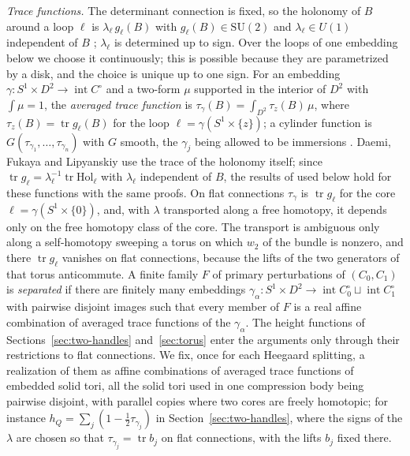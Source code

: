 \documentclass[11pt]{amsart}
\theoremstyle{definition}
\theoremstyle{remark}
\theoremstyle{plain}
\numberwithin{equation}{section}
\newcommand{\tr}{\operatorname{tr}}
\newcommand{\SU}{\mathrm{SU}}
\begin{document}
\emph{Trace functions.} The determinant connection is fixed, so the holonomy of $B$ around a
loop $\ell$ is $\lambda_\ell\,g_\ell(B)$ with $g_\ell(B)\in\SU(2)$ and $\lambda_\ell\in U(1)$
independent of $B$ \cite[Section~5.6, p.~147]{Donaldson-book}; $\lambda_\ell$ is determined up to
sign. Over the loops of one embedding below we choose it continuously; this is possible because
they are parametrized by a disk, and the choice is unique up to one sign. For an embedding
$\gamma\colon S^1\times D^2\to\operatorname{int}C^\circ$ and a two-form $\mu$ supported in the
interior of $D^2$ with $\int\mu=1$, the \emph{averaged trace function} is
$\tau_{\gamma}(B)=\int_{D^2}\tau_z(B)\,\mu$, where $\tau_z(B)=\tr g_\ell(B)$ for the loop
$\ell=\gamma(S^1\times\{z\})$; a cylinder function is
$G(\tau_{\gamma_1},\dots,\tau_{\gamma_n})$ with $G$ smooth, the $\gamma_j$ being allowed to be
immersions \cite[Section~6.1]{DFL}. Daemi, Fukaya and Lipyanskiy use the trace of the holonomy
itself; since $\tr g_\ell=\lambda_\ell^{-1}\tr\mathrm{Hol}_\ell$ with $\lambda_\ell$ independent of
$B$, the results of \cite[Section~6]{DFL} used below hold for these functions with the same
proofs. On flat connections $\tau_\gamma$ is $\tr g_\ell$ for the core
$\ell=\gamma(S^1\times\{0\})$, and, with $\lambda$ transported along a free homotopy, it depends
only on the free homotopy class of the core. The transport is ambiguous only along a
self-homotopy sweeping a torus on which $w_2$ of the bundle is nonzero, and there
$\tr g_\ell$ vanishes on flat connections, because the lifts of the two generators of that torus
anticommute. A finite family $F$ of primary perturbations of $(C_0,C_1)$ is \emph{separated} if
there are finitely many embeddings $\gamma_\alpha\colon S^1\times D^2\to\operatorname{int}C_0^\circ
\sqcup\operatorname{int}C_1^\circ$ with pairwise disjoint images such that every member of $F$ is
a real affine combination of averaged trace functions of the $\gamma_\alpha$. The height
functions of Sections~\ref{sec:two-handles} and~\ref{sec:torus} enter the arguments only through
their restrictions to flat connections. We fix, once for each Heegaard splitting, a realization of
them as affine combinations of averaged trace functions of embedded solid tori, all the solid
tori used in one compression body being pairwise disjoint, with parallel copies where two cores
are freely homotopic; for instance $h_Q=\sum_j(1-\tfrac12\tau_{\gamma_j})$ in
Section~\ref{sec:two-handles}, where the signs of the $\lambda$ are chosen so that
$\tau_{\gamma_j}=\tr b_j$ on flat connections, with the lifts $b_j$ fixed there.
\end{document}
